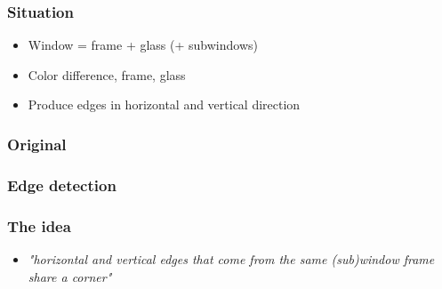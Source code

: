 \documentclass{beamer}
\begin{document}
\frame
{
	\frametitle{Situation}
	\begin{itemize}
	\item <+-| alert@+> Window = frame + glass (+ subwindows)
	\item <+-| alert@+> Color difference, frame, glass
	\item <+-| alert@+> Produce edges in horizontal and vertical direction
	\end{itemize}
}

\frame
{
	\frametitle{Original}
}

\frame
{
	\frametitle{Edge detection}
}



\frame
{
	\frametitle{The idea}
	\begin{itemize}
	\item <+-| alert@+> \emph{"horizontal and vertical edges that come from the same (sub)window frame share a corner"}
	\end{itemize}
}
\end{document}
